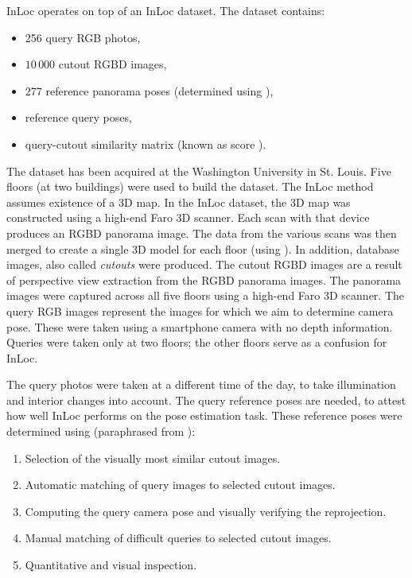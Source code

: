 \documentclass[twoside]{ctuthesis}
\theoremstyle{plain}
\theoremstyle{definition}
\theoremstyle{note}
\newcommand{\code}[1]{{\ttfamily #1%
}}
\begin{document}
InLoc operates on top of an InLoc dataset. The dataset contains:

\begin{itemize}
	\item 256 query RGB photos,
	\item $10\,000$ cutout RGBD images,
	\item 277 reference panorama poses (determined using \cite{wijmans17rgbd}),
	\item reference query poses,
	\item query-cutout similarity matrix (known as \code{score}).
\end{itemize}

The dataset has been acquired at the Washington University in St. Louis. Five floors (at two buildings) were used to build the dataset. The InLoc method assumes existence of a 3D map. In the InLoc dataset, the 3D map was constructed using a high-end Faro 3D scanner. Each scan with that device produces an RGBD panorama image. The data from the various scans was then merged to create a single 3D model for each floor (using \cite{wijmans17rgbd}). In addition, database images, also called \emph{cutouts} were produced. The cutout RGBD images are a result of perspective view extraction from the RGBD panorama images. The panorama images were captured across all five floors using a high-end Faro 3D scanner. The query RGB images represent the images for which we aim to determine camera pose. These were taken using a smartphone camera with no depth information. Queries were taken only at two floors; the other floors serve as a confusion for InLoc.

The query photos were taken at a different time of the day, to take illumination and interior changes into account. The query reference poses are needed, to attest how well InLoc performs on the pose estimation task. These reference poses were determined using (paraphrased from \cite{taira2018inloc}):

\begin{enumerate}
	\item Selection of the visually most similar cutout images.
	\item Automatic matching of query images to selected cutout images.
	\item Computing the query camera pose and visually verifying the reprojection.
	\item Manual matching of difficult queries to selected cutout images.
	\item Quantitative and visual inspection.
\end{enumerate}
\end{document}

